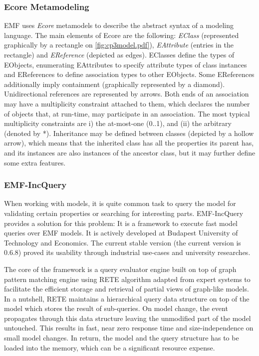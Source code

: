 \subsubsection{Ecore Metamodeling~\cite{MODELS10}}
EMF uses \emph{Ecore} metamodels to describe the abstract syntax of a modeling
language. The main elements of Ecore are the following: \emph{EClass}
(represented graphically by a rectangle on \autoref{fig:cp3model.pdf}),
\emph{EAttribute} (entries in the rectangle) and \emph{EReference} (depicted as
edges). EClasses define the types of EObjects, enumerating EAttributes to
specify attribute types of class instances and EReferences to define association
types to other EObjects. Some EReferences additionally imply containment
(graphically represented by a diamond).
Unidirectional references are represented by arrows. Both ends of an association
may have a multiplicity constraint attached to them, which declares the number
of objects that, at run-time, may participate in an association. The most
typical multiplicity constraints are i) the at-most-one (0..1), and (ii) the
arbitrary (denoted by *). Inheritance may be defined between classes (depicted
by a hollow arrow), which means that the inherited class has all the properties
its parent has, and its instances are also instances of the ancestor class, but
it may further define some extra features.


\subsubsection{EMF-IncQuery~\cite{icmt2011}} 

When working with models, it is quite common task to query the model for
validating certain properties or searching for interesting parts. EMF-IncQuery
\cite{EMFIncQuery} provides a solution for this problem: It is a framework to
execute fast model queries over EMF models. It is actively developed at Budapest
University of Technology and Economics. The current stable version  (the current
version is 0.6.8)  proved its usability through industrial use-cases
and university researches.

The core of the framework is a query evaluator engine built on top of graph
pattern matching engine using RETE \cite{RETE} algorithm adapted from expert
systems to facilitate the efficient storage and retrieval of partial views of
graph-like models. In a nutshell, RETE maintains a hierarchical query data
structure on top of the model which stores the result of sub-queries. On model
change, the event propagates through this data structure leaving the unmodified
part of the model untouched. This results in fast, near zero response time and
size-independence on small model changes. In return, the model and the query
structure has to be loaded into the memory, which can be a significant resource
expense.

